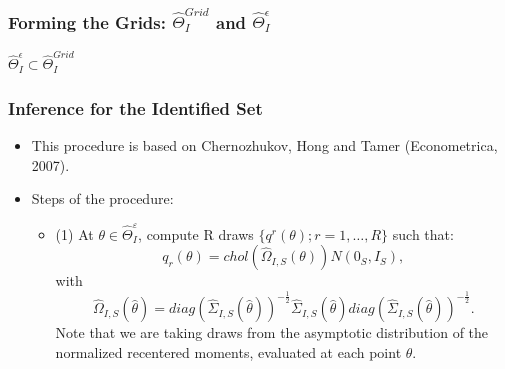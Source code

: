\documentclass[10pt,letterpaper]{beamer}
\begin{document}
\begin{frame}
\frametitle{Forming the Grids: $\widehat{\Theta}_{I}^{Grid}$ and $\widehat{\Theta}_{I}^{\epsilon}$}

$\widehat{\Theta}_{I}^{\epsilon}\subset \widehat{\Theta}_{I}^{Grid}$

\begin{figure}[h!]
\begin{center}
\end{center}
\end{figure}	
\end{frame}
\begin{frame}
\frametitle{Inference for the Identified Set}

\begin{itemize}
	\item This procedure is based on Chernozhukov, Hong and Tamer (Econometrica, 2007).
	\item Steps of the procedure:
	\begin{itemize}
		\item (1) At $\theta\in\widehat{\Theta}_{I}^{\varepsilon }$, compute R draws $\{q^{r}(\theta); r=1,\dots,R\}$ such that:
		\begin{equation*}
		q_{r}(\theta)=chol(\widehat{\Omega}_{I,S}(\theta))N(0_{S},I_{S}),
		\end{equation*}
		with
		\begin{equation*}
		\widehat{\Omega }_{I,S}(\hat{\theta})=diag(\widehat{\Sigma}_{I,S}(\hat{\theta}))^{-\frac{1}{2}}\widehat{\Sigma}_{I,S}(\hat{\theta})diag(\widehat{\Sigma}_{I,S}(\hat{\theta}))^{-\frac{1}{2}}.
		\end{equation*}
		Note that we are taking draws from the asymptotic distribution of the normalized recentered moments, evaluated at each point $\theta$.
	\end{itemize}
\end{itemize}
\end{frame}
\end{document}
